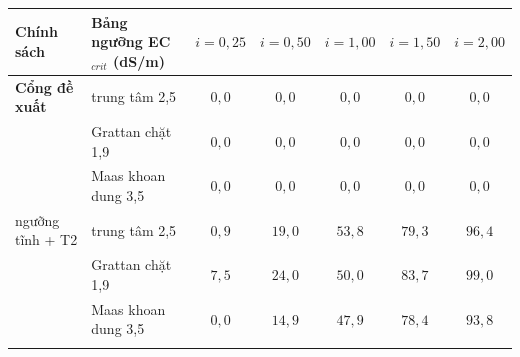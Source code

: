 
\begin{tabular}{@{}llccccc@{}}
\toprule
Chính sách & Bảng ngưỡng EC$_{crit}$ (dS/m) & $i=0{,}25$ & $i=0{,}50$ & $i=1{,}00$ & $i=1{,}50$ & $i=2{,}00$ \\
\midrule
\textbf{Cổng đề xuất} & trung tâm 2,5 & $0{,}0$ & $0{,}0$ & $0{,}0$ & $0{,}0$ & $0{,}0$ \\
 & Grattan chặt 1,9 & $0{,}0$ & $0{,}0$ & $0{,}0$ & $0{,}0$ & $0{,}0$ \\
 & Maas khoan dung 3,5 & $0{,}0$ & $0{,}0$ & $0{,}0$ & $0{,}0$ & $0{,}0$ \\
\addlinespace[2pt]
ngưỡng tĩnh + T2 & trung tâm 2,5 & $0{,}9$ & $19{,}0$ & $53{,}8$ & $79{,}3$ & $96{,}4$ \\
 & Grattan chặt 1,9 & $7{,}5$ & $24{,}0$ & $50{,}0$ & $83{,}7$ & $99{,}0$ \\
 & Maas khoan dung 3,5 & $0{,}0$ & $14{,}9$ & $47{,}9$ & $78{,}4$ & $93{,}8$ \\
\addlinespace[2pt]
\bottomrule
\end{tabular}

